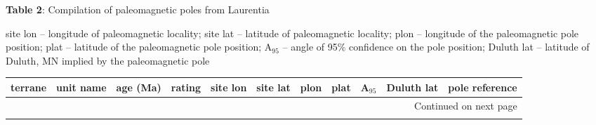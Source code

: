\documentclass[twocolumn, switch]{article} %
\begin{document}
{\scriptsize
\begin{landscape}
\textbf{Table 2}: Compilation of paleomagnetic poles from Laurentia
\begin{ThreePartTable}
\begin{TableNotes}
\footnotesize
site lon -- longitude of paleomagnetic locality;
site lat -- latitude of paleomagnetic locality;
plon -- longitude of the paleomagnetic pole position;
plat -- latitude of the paleomagnetic pole position;
A$_{95}$ -- angle of 95$\%$ confidence on the pole position;
Duluth lat -- latitude of Duluth, MN implied by the paleomagnetic pole
\end{TableNotes}

\begin{longtable}{p{1.4 in}p{1.2 in}rrrrrrrrp{1.2 in}}
\toprule
terrane & unit name & age (Ma) & rating & site lon & site lat & plon & plat & A$_{95}$ & Duluth lat & pole reference \\ \hline
\midrule
\endhead
\midrule
\multicolumn{11}{r}{{Continued on next page}} \\ \hline
\midrule
\endfoot


\end{longtable}
\end{ThreePartTable}
\end{landscape}}
\end{document}
